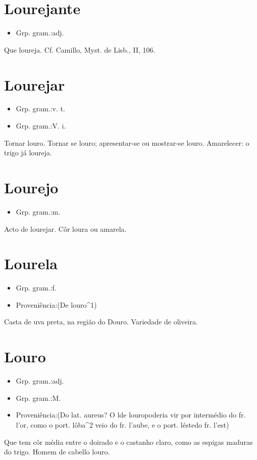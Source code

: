 \section{Lourejante}
\begin{itemize}
\item {Grp. gram.:adj.}
\end{itemize}
Que loureja. Cf. Camillo, \textunderscore Myst. de Lisb.\textunderscore , II, 106.
\section{Lourejar}
\begin{itemize}
\item {Grp. gram.:v. t.}
\end{itemize}
\begin{itemize}
\item {Grp. gram.:V. i.}
\end{itemize}
Tornar louro.
Tornar se louro; apresentar-se ou mostrar-se louro.
Amarelecer: \textunderscore o trigo já loureja\textunderscore .
\section{Lourejo}
\begin{itemize}
\item {Grp. gram.:m.}
\end{itemize}
Acto de lourejar.
Côr loura ou amarela.
\section{Lourela}
\begin{itemize}
\item {Grp. gram.:f.}
\end{itemize}
\begin{itemize}
\item {Proveniência:(De \textunderscore louro\textunderscore ^1)}
\end{itemize}
Casta de uva preta, na região do Douro.
Variedade de oliveira.
\section{Louro}
\begin{itemize}
\item {Grp. gram.:adj.}
\end{itemize}
\begin{itemize}
\item {Grp. gram.:M.}
\end{itemize}
\begin{itemize}
\item {Proveniência:(Do lat. \textunderscore aureus\textunderscore ? O \textunderscore l\textunderscore  de \textunderscore louro\textunderscore  poderia vir por intermédio do fr. \textunderscore l'or\textunderscore , como o port. \textunderscore lôba\textunderscore ^2 veio do fr. \textunderscore l'aube\textunderscore , e o port. \textunderscore léste\textunderscore  do fr. \textunderscore l'est\textunderscore )}
\end{itemize}
Que tem côr média entre o doirado e o castanho claro, como as espigas maduras do trigo.
Homem de cabello louro.

